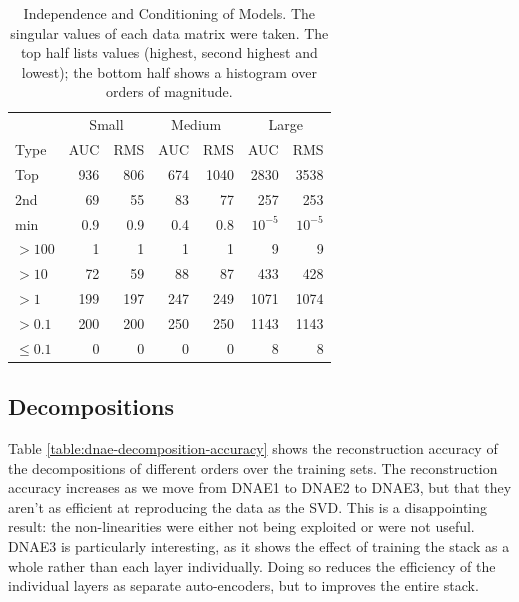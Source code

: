 \documentclass{article}
\begin{document}
\begin{table}[t]
\caption{Independence and Conditioning of Models.  The singular values of each data matrix were taken.  The top half lists values (highest, second highest and lowest); the bottom half shows a histogram over orders of magnitude.}
\label{table:sv-distributions}
\vskip 0.15in
\begin{center}
\begin{small}
\begin{sc}
\begin{tabular}{lrrrrrr}
\hline
\abovespace\belowspace
& \multicolumn{2}{c}{Small} & \multicolumn{2}{c}{Medium} & \multicolumn{2}{c}{Large} \\
Type & AUC & RMS & AUC & RMS & AUC & RMS \\
\hline
\abovespace
Top        & 936 & 806 & 674 & 1040 & 2830   & 3538 \\
2nd        &  69 &  55 &  83 &   77 &  257   &  253 \\
min        & 0.9 & 0.9 & 0.4 &  0.8 & $10^{-5}$& $10^{-5}$ \\
\abovespace
$> 100$    &   1 &   1 &   1 &    1 &    9   &    9 \\
$> 10$     &  72 &  59 &  88 &   87 &  433   &  428 \\
$> 1$      & 199 & 197 & 247 &  249 & 1071   & 1074 \\
$> 0.1$    & 200 & 200 & 250 &  250 & 1143   & 1143 \\
\belowspace
$\leq 0.1$ &   0 &   0 &   0 &    0 &    8   &    8 \\
\hline
\end{tabular}
\end{sc}
\end{small}
\end{center}
\vskip -0.1in
\end{table}

\subsection{Decompositions}

Table \ref{table:dnae-decomposition-accuracy} shows the reconstruction accuracy of the decompositions of different orders over the training sets.
The reconstruction accuracy increases as we move from DNAE1 to DNAE2 to DNAE3, but that they aren't as efficient at reproducing the data as the SVD.
This is a disappointing result: the non-linearities were either not being exploited or were not useful.
DNAE3 is particularly interesting, as it shows the effect of training the stack as a whole rather than each layer individually.  Doing so reduces the efficiency of the individual layers as separate auto-encoders, but to improves the entire stack.
\end{document}
